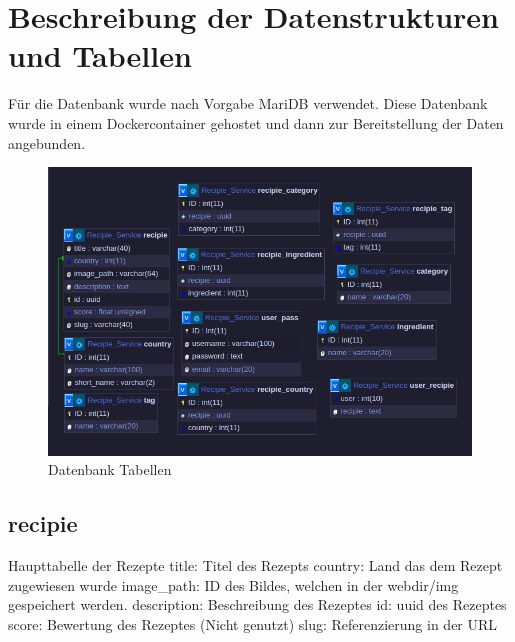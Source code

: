 \documentclass{article}
\begin{document}
\pagebreak
\section{Beschreibung der Datenstrukturen \newline und Tabellen}

Für die Datenbank wurde nach Vorgabe MariDB verwendet. Diese Datenbank wurde in einem Dockercontainer gehostet und dann zur Bereitstellung der Daten angebunden.

\begin{figure}[!hbt]
    \centering
    \includegraphics[scale=0.75, width=\textwidth]{Pictures/DB_Tables2.png}
    \caption{Datenbank Tabellen}
    \label{fig:sfig1}
\end{figure}

\subsection{recipie}
Haupttabelle der Rezepte
\newline
title: Titel des Rezepts
\newline
country: Land das dem Rezept zugewiesen wurde
\newline
image\_path: ID des Bildes, welchen in der webdir/img gespeichert werden.
\newline
description: Beschreibung des Rezeptes
\newline
id: uuid des Rezeptes
\newline
score: Bewertung des Rezeptes (Nicht genutzt)
\newline
slug: Referenzierung in der URL

\pagebreak
\end{document}
